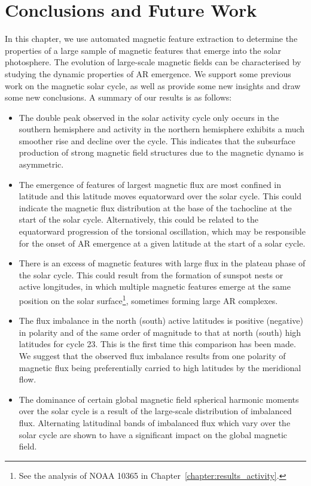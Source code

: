 \section{Conclusions and Future Work}\label{discussion}

In this chapter, we use automated magnetic feature extraction to determine the properties of a large sample of magnetic features that emerge into the solar photosphere. The evolution of large-scale magnetic fields can be characterised by studying the dynamic properties of \gls{AR} emergence. We support some previous work on the magnetic solar cycle, as well as provide some new insights and draw some new conclusions. A summary of our results is as follows: 
\begin{itemize}
\item The double peak observed in the solar activity cycle only occurs in the southern hemisphere and activity in the northern hemisphere exhibits a much smoother rise and decline over the cycle. This indicates that the subsurface production of strong magnetic field structures due to the magnetic dynamo is asymmetric. 
\item The emergence of features of largest magnetic flux are most confined in latitude and this latitude moves equatorward over the solar cycle. This could indicate the magnetic flux distribution at the base of the tachocline at the start of the solar cycle. Alternatively, this could be related to the equatorward progression of the torsional oscillation, which may be responsible for the onset of \gls{AR} emergence at a given latitude at the start of a solar cycle. 
\item There is an excess of magnetic features with large flux in the plateau phase of the solar cycle. This could result from the formation of sunspot nests or active longitudes, in which multiple magnetic features emerge at the same position on the solar surface\footnote{See the analysis of NOAA 10365 in Chapter~\ref{chapter:results_activity}.}, sometimes forming large \gls{AR} complexes.
\item The flux imbalance in the north (south) active latitudes is positive (negative) in polarity and of the same order of magnitude to that at north (south) high latitudes for cycle 23. This is the first time this comparison has been made. We suggest that the observed flux imbalance results from one polarity of magnetic flux being preferentially carried to high latitudes by the meridional flow.
\item The dominance of certain global magnetic field spherical harmonic moments over the solar cycle is a result of the large-scale distribution of imbalanced flux. Alternating latitudinal bands of imbalanced flux which vary over the solar cycle are shown to have a significant impact on the global magnetic field.
\end{itemize}

